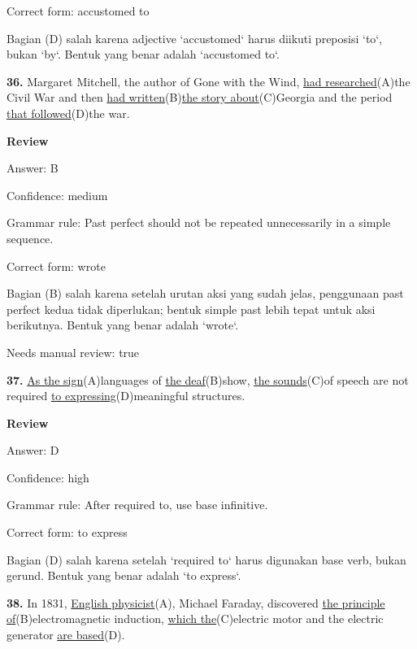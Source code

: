 \documentclass[12pt]{article}
\begin{document}
Correct form: accustomed to\par
Bagian (D) salah karena adjective `accustomed` harus diikuti preposisi `to`, bukan `by`. Bentuk yang benar adalah `accustomed to`.\par
\endgroup
\par
\vspace{\questionblockgap}
\noindent\textbf{36.} Margaret Mitchell, the author of Gone with the Wind, \uline{had researched}(A)the Civil War and then \uline{had written}(B)\uline{the story about}(C)Georgia and the period \uline{that followed}(D)the war.
\par
\begingroup
\setlength{\parskip}{0pt}
\setlength{\parindent}{0pt}
\textbf{Review}\par
Answer: B\par
Confidence: medium\par
Grammar rule: Past perfect should not be repeated unnecessarily in a simple sequence.\par
Correct form: wrote\par
Bagian (B) salah karena setelah urutan aksi yang sudah jelas, penggunaan past perfect kedua tidak diperlukan; bentuk simple past lebih tepat untuk aksi berikutnya. Bentuk yang benar adalah `wrote`.\par
Needs manual review: true\par
\endgroup
\par
\vspace{\questionblockgap}
\noindent\textbf{37.} \uline{As the sign}(A)languages of \uline{the deaf}(B)show, \uline{the sounds}(C)of speech are not required \uline{to expressing}(D)meaningful structures.
\par
\begingroup
\setlength{\parskip}{0pt}
\setlength{\parindent}{0pt}
\textbf{Review}\par
Answer: D\par
Confidence: high\par
Grammar rule: After required to, use base infinitive.\par
Correct form: to express\par
Bagian (D) salah karena setelah `required to` harus digunakan base verb, bukan gerund. Bentuk yang benar adalah `to express`.\par
\endgroup
\par
\vspace{\questionblockgap}
\noindent\textbf{38.} In 1831, \uline{English physicist}(A), Michael Faraday, discovered \uline{the principle of}(B)electromagnetic induction, \uline{which the}(C)electric motor and the electric generator \uline{are based}(D).
\end{document}

